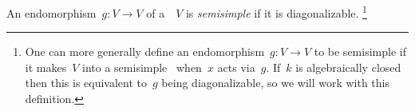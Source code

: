 % 
% 
% 
% 
% 
% 


\begin{definition}
  An endomorphism~$g \colon V \to V$ of a~~$V$ is \emph{semisimple} if it is diagonalizable.%
  \footnote{One can more generally define an endomorphism~$g \colon V \to V$ to be semisimple if it makes~$V$ into a semisimple~\dash{$klx]$}{module} when~$x$ acts via~$g$.
  If~$k$ is algebraically closed then this is equivalent to~$g$ being diagonalizable, so we will work with this definition.}
\end{definition}


